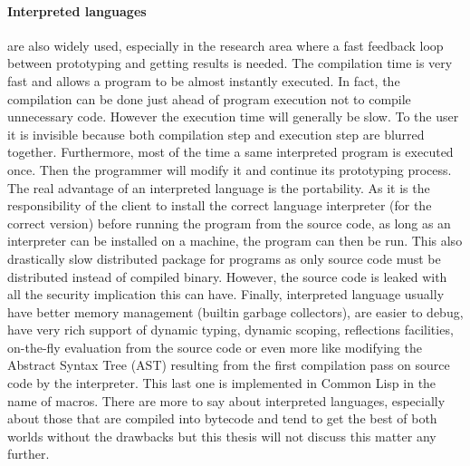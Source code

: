 \paragraph{Interpreted languages} are also widely used, especially in the research area where a fast feedback loop
between prototyping and getting results is needed. The compilation time is very fast and allows a program to be almost
instantly executed. In fact, the compilation can be done just ahead of program execution not to compile unnecessary
code. However the execution time will generally be slow. To the user it is invisible because both compilation step and
execution step are blurred together. Furthermore, most of the time a same interpreted program is executed once. Then the
programmer will modify it and continue its prototyping process. The real advantage of an interpreted language is the
portability. As it is the responsibility of the client to install the correct language interpreter (for the correct
version) before running the program from the source code, as long as an interpreter can be installed on a machine, the
program can then be run. This also drastically slow distributed package for programs as only source code must be
distributed instead of compiled binary. However, the source code is leaked with all the security implication this can
have. Finally, interpreted language usually have better memory management (builtin garbage collectors), are easier to
debug, have very rich support of dynamic typing, dynamic scoping, reflections facilities, on-the-fly evaluation from the
source code or even more like modifying the Abstract Syntax Tree (AST) resulting from the first compilation pass on
source code by the interpreter. This last one is implemented in Common Lisp in the name of macros. There are more to say
about interpreted languages, especially about those that are compiled into bytecode and tend to get the best of both
worlds without the drawbacks but this thesis will not discuss this matter any further.

